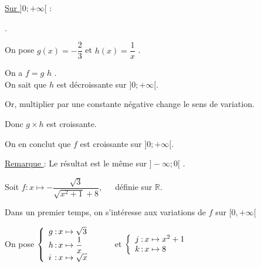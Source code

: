 
\underline{Sur $]0;+\infty[$} :

 .

On pose $g(x) = -\dfrac{2}{3}$ et $h(x) = \dfrac{1}{x}$ . 

On a $f=g$ $h$ .\\
On sait que $h$ est décroissante sur $]0;+\infty[$.

Or, multiplier par une constante négative change le sens de variation. 

Donc $g\times h$ est croissante.

On en conclut que $f$ est croissante sur $]0; +\infty[$. 

\underline{Remarque } : Le résultat est le même sur $]-\infty ; 0[$ . 

\newpage


Soit $f:x\mapsto  - \dfrac{\sqrt{3}}{\sqrt{x^2+1}+8}$,  $\quad$   définie sur $\mathbb{R}$.

Dans un premier temps, on s'intéresse aux variations de $f$ sur $[0, +\infty[$


On pose $\left\lbrace \begin{array}{l@{\,:\,}l}
                        g & x \mapsto \sqrt{3} \\
                        h & x \mapsto \dfrac{1}{x} \\
                        i & x \mapsto \sqrt{x} \\
                    \end{array}    \right. $  $\qquad$ et $ \left\lbrace \begin{array}{l@{\,:\,}l}
                                                                        j & x \mapsto x^2 + 1 \\
                                                                        k & x \mapsto 8 \\
                                                                          \end{array}    \right. $ 
                                                                          
